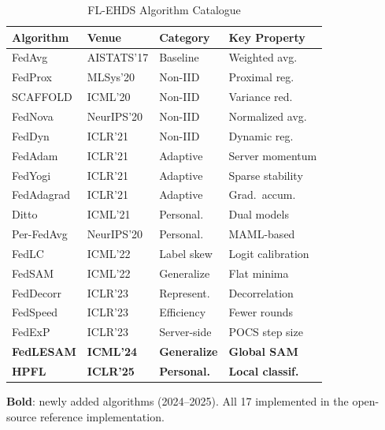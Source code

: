 \documentclass[conference]{IEEEtran}
\begin{document}
\begin{table}[htbp]
\centering
\caption{FL-EHDS Algorithm Catalogue}
\label{tab:algo_catalogue_supp}
\small
\begin{tabular}{llll}
\toprule
\textbf{Algorithm} & \textbf{Venue} & \textbf{Category} & \textbf{Key Property} \\
\midrule
FedAvg & AISTATS'17 & Baseline & Weighted avg. \\
FedProx & MLSys'20 & Non-IID & Proximal reg. \\
SCAFFOLD & ICML'20 & Non-IID & Variance red. \\
FedNova & NeurIPS'20 & Non-IID & Normalized avg. \\
FedDyn & ICLR'21 & Non-IID & Dynamic reg. \\
FedAdam & ICLR'21 & Adaptive & Server momentum \\
FedYogi & ICLR'21 & Adaptive & Sparse stability \\
FedAdagrad & ICLR'21 & Adaptive & Grad.\ accum. \\
Ditto & ICML'21 & Personal. & Dual models \\
Per-FedAvg & NeurIPS'20 & Personal. & MAML-based \\
FedLC & ICML'22 & Label skew & Logit calibration \\
FedSAM & ICML'22 & Generalize & Flat minima \\
FedDecorr & ICLR'23 & Represent. & Decorrelation \\
FedSpeed & ICLR'23 & Efficiency & Fewer rounds \\
FedExP & ICLR'23 & Server-side & POCS step size \\
\textbf{FedLESAM} & \textbf{ICML'24} & \textbf{Generalize} & \textbf{Global SAM} \\
\textbf{HPFL} & \textbf{ICLR'25} & \textbf{Personal.} & \textbf{Local classif.} \\
\bottomrule
\end{tabular}

\vspace{1mm}
\footnotesize{\textbf{Bold}: newly added algorithms (2024--2025). All 17 implemented in the open-source reference implementation.}
\end{table}
\end{document}
